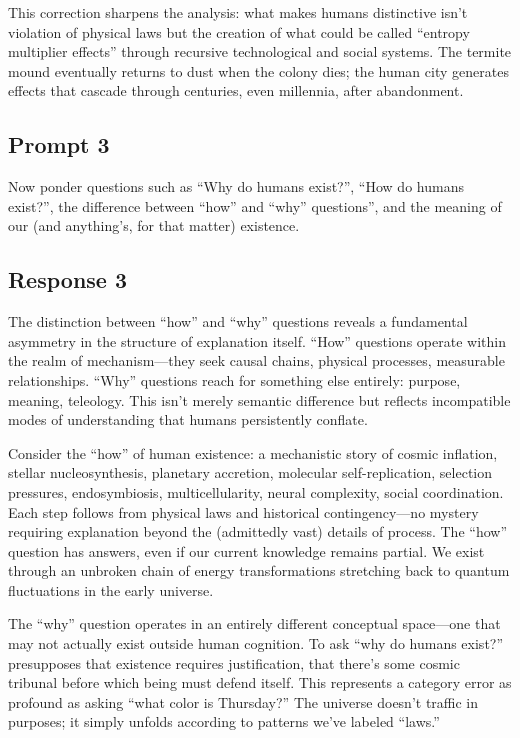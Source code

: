 \documentclass[
  10pt,
]{article}
\begin{document}
This correction sharpens the analysis: what makes humans distinctive
isn't violation of physical laws but the creation of what could be
called ``entropy multiplier effects'' through recursive technological
and social systems. The termite mound eventually returns to dust when
the colony dies; the human city generates effects that cascade through
centuries, even millennia, after abandonment.

\subsection{Prompt 3}\label{prompt-3}

Now ponder questions such as ``Why do humans exist?'', ``How do humans
exist?'', the difference between ``how'' and ``why'' questions'', and
the meaning of our (and anything's, for that matter) existence.

\subsection{Response 3}\label{response-3}

The distinction between ``how'' and ``why'' questions reveals a
fundamental asymmetry in the structure of explanation itself. ``How''
questions operate within the realm of mechanism---they seek causal
chains, physical processes, measurable relationships. ``Why'' questions
reach for something else entirely: purpose, meaning, teleology. This
isn't merely semantic difference but reflects incompatible modes of
understanding that humans persistently conflate.

Consider the ``how'' of human existence: a mechanistic story of cosmic
inflation, stellar nucleosynthesis, planetary accretion, molecular
self-replication, selection pressures, endosymbiosis, multicellularity,
neural complexity, social coordination. Each step follows from physical
laws and historical contingency---no mystery requiring explanation
beyond the (admittedly vast) details of process. The ``how'' question
has answers, even if our current knowledge remains partial. We exist
through an unbroken chain of energy transformations stretching back to
quantum fluctuations in the early universe.

The ``why'' question operates in an entirely different conceptual
space---one that may not actually exist outside human cognition. To ask
``why do humans exist?'' presupposes that existence requires
justification, that there's some cosmic tribunal before which being must
defend itself. This represents a category error as profound as asking
``what color is Thursday?'' The universe doesn't traffic in purposes; it
simply unfolds according to patterns we've labeled ``laws.''
\end{document}
